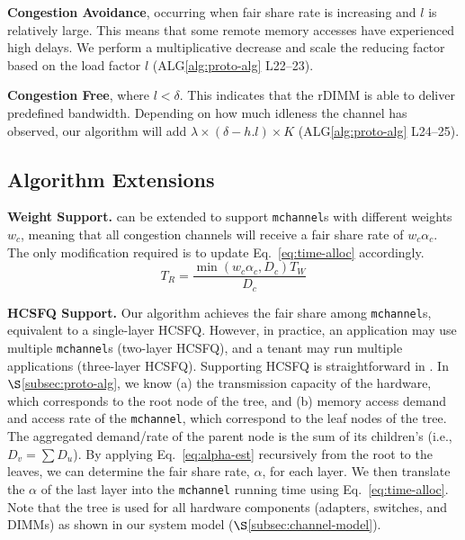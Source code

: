 \squishlist
    \item {\bf Congestion Avoidance}, occurring when fair share rate is increasing and \(l\) is relatively large. This means that some remote memory accesses have experienced high delays. We perform a multiplicative decrease and scale the reducing factor based on the load factor \(l\) (ALG\ref{alg:proto-alg} L22--23).
    
    \item {\bf Congestion Free}, where \(l < \delta\). This indicates that the rDIMM is able to deliver predefined bandwidth. Depending on how much idleness the channel has observed, our algorithm will add \(\lambda \times (\delta -h.l)\times K\) (ALG\ref{alg:proto-alg} L24--25).
        
\squishend

\subsection{Algorithm Extensions}
\label{subsec:proto-ext}

\noindent
\textbf{Weight Support.} \sys can be extended to support \texttt{mchannel}s with different weights \(w_c\), meaning that all congestion channels will receive a fair share rate of \(w_c\alpha_c\). The only modification required is to update Eq.~\ref{eq:time-alloc} accordingly.
\begin{equation}
\label{eq:weighted-time-alloc}
    T_R = \frac{\min(w_c\alpha_c, D_c)T_W}{D_c}
\end{equation}

\noindent
\textbf{HCSFQ Support.} Our algorithm achieves the fair share among \texttt{mchannel}s, equivalent to a single-layer HCSFQ.
However, in practice, an application may use multiple \texttt{mchannel}s (two-layer HCSFQ), and a tenant may run multiple applications (three-layer HCSFQ). Supporting HCSFQ is straightforward in \sys. In \(\S\)\ref{subsec:proto-alg}, we know (a) the transmission capacity of the hardware, which corresponds to the root node of the tree, and (b) memory access demand and access rate of the \texttt{mchannel}, which correspond to the leaf nodes of the tree. The aggregated demand/rate of the parent node is the sum of its children's (i.e., \(D_v = \sum D_u\)). By applying Eq.~\ref{eq:alpha-est} recursively from the root to the leaves, we can determine the fair share rate, \(\alpha\), for each layer. We then translate the \(\alpha\) of the last layer into the \texttt{mchannel} running time using Eq.~\ref{eq:time-alloc}. Note that the tree is used for all hardware components (adapters, switches, and DIMMs) as shown in our system model (\(\S\)\ref{subsec:channel-model}).

